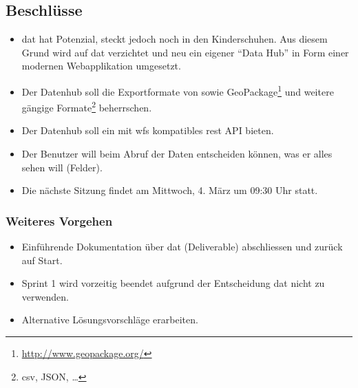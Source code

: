 \documentclass[class=scrbook,crop=false]{standalone}
\begin{document}
	\subsection*{Beschlüsse}
	\begin{itemize}
		\item \gls{dat} hat Potenzial, steckt jedoch noch in den Kinderschuhen. Aus diesem Grund wird auf \gls{dat} verzichtet und neu ein eigener ``Data Hub'' in Form einer modernen Webapplikation umgesetzt.
		\item Der Datenhub soll die Exportformate von  sowie GeoPackage\footnote{\url{http://www.geopackage.org/}} und weitere gängige Formate\footnote{\acs{csv}, JSON, \dots} beherrschen.
		\item Der Datenhub soll ein mit \gls{wfs} kompatibles \acs{rest} API bieten.
		\item Der Benutzer will beim Abruf der Daten entscheiden können, was er alles sehen will (Felder).
		\item Die nächste Sitzung findet am Mittwoch, 4. März um 09:30 Uhr statt.
	\end{itemize}
	
	\subsubsection*{Weiteres Vorgehen}
	\begin{itemize}
		\item Einführende Dokumentation über \gls{dat} (Deliverable) abschliessen und zurück auf Start.
		\item Sprint 1 wird vorzeitig beendet aufgrund der Entscheidung \gls{dat} nicht zu verwenden.
		\item Alternative Lösungsvorschläge erarbeiten.
	\end{itemize}
	
\end{document}
